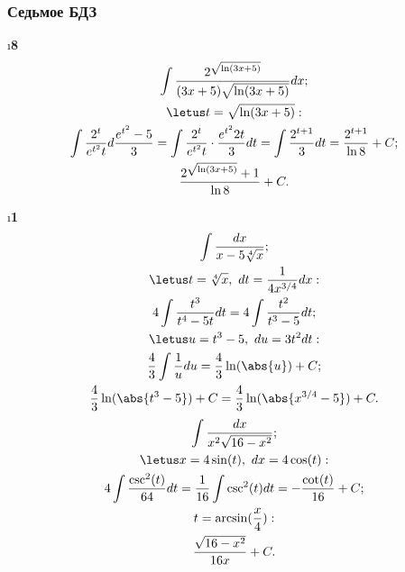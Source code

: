 \subsubsection{Седьмое БДЗ}

\setcounter{iii}{5}

\i \textbf{8}
\begin{gather*}
    \int \frac{2^{\sqrt{\ln(3x+5)}}}{(3x+5)\sqrt{\ln(3x+5)}}dx;\\
    \letus t = \sqrt{\ln(3x+5)}:\\
    \int \frac{2^t}{e^{t^2}t}d\frac{e^{t^2}-5}{3} = 
    \int \frac{2^t}{e^{t^2}t}\cdot \frac{e^{t^2}2t}{3} dt =
    \int \frac{2^{t+1}}{3} dt = 
    \frac{2^{t+1}}{\ln 8} + C;\\
    \frac{2^{\sqrt{\ln(3x+5)}}+1}{\ln 8} + C.
\end{gather*}

\i \textbf{1}\\
\pu 
\begin{gather*}
    \int \frac{dx}{x-5\sqrt[4]{x}};\\
    \letus t = \sqrt[4]{x},\ dt = \frac{1}{4x^{3/4}}dx:\\
    4 \int \frac{t^3}{t^4 - 5t}dt = 4\int \frac{t^2}{t^3 - 5}dt;\\
    \letus u = t^3-5,\ du = 3t^2 dt:\\
    \frac{4}{3} \int \frac{1}{u} du = \frac{4}{3} \ln(\abs{u}) + C;\\
    \frac{4}{3} \ln(\abs{t^3-5}) + C = \frac{4}{3} \ln(\abs{x^{3/4}-5}) + C.
\end{gather*}
\pu 
\begin{gather*}
    \int \frac{dx}{x^2\sqrt{16-x^2}};\\
    \letus x = 4\sin(t),\ dx = 4\cos(t):\\
    4 \int \frac{\csc^2(t)}{64}dt = \frac{1}{16} \int \csc^2(t) dt = -\frac{\cot(t)}{16} + C;\\
    t = \arcsin(\frac{x}{4}):\\
    \frac{\sqrt{16-x^2}}{16x} + C.
\end{gather*}

